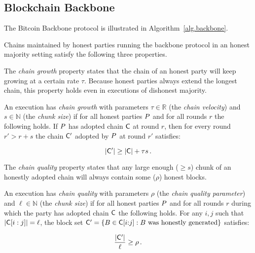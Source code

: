\subsection{Blockchain Backbone}

\cite{backbone,pass-asynchronous,varbackbone}

The Bitcoin Backbone protocol is illustrated in Algorithm~\ref{alg.backbone}.




Chains maintained by honest parties running the backbone protocol in an honest
majority setting satisfy the following three properties.

The \emph{chain growth} property states that the chain of an honest party will
keep growing at a certain rate $\tau$. Because honest parties always extend the
longest chain, this property holds even in executions of dishonest majority.

\begin{definition}
  An execution has \emph{chain growth} with parameters $\tau \in \mathbb{R}$
  (the \emph{chain velocity}) and $s \in \mathbb{N}$ (the \emph{chunk size}) if
  for all honest parties $P$ and for all rounds $r$ the following holds. If
  $P$ has adopted chain $\mathsf{C}$ at round $r$, then for every round $r' > r
  + s$ the chain $\mathsf{C}'$ adopted by $P$ at round $r'$ satisfies:

  \[
  |\mathsf{C}'| \geq |\mathsf{C}| + \tau s
  \,.
  \]
\end{definition}

The \emph{chain quality} property states that any large enough ($\geq s$) chunk
of an honestly adopted chain will always contain some ($\rho$) honest blocks.

\begin{definition}
  An execution has \emph{chain quality} with parameters $\rho$ (the
  \emph{chain quality parameter}) and $\ell \in \mathbb{N}$ (the \emph{chunk size})
  if for all honest parties $P$ and for all rounds $r$ during which the
  party has adopted chain $\mathsf{C}$ the following holds. For any $i, j$ such that
  $|\mathsf{C}[i:j]| = \ell$, the block set $\mathsf{C}' = \{B \in \mathsf{C}[i{:}j]: B \text{
  was honestly generated}\}$ satisfies:

  \[
  \frac{|\mathsf{C}'|}{\ell} \geq \rho
  \,.
  \]
\end{definition}

